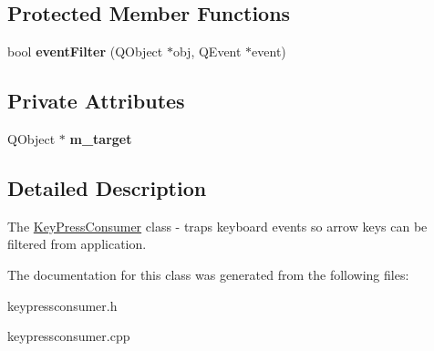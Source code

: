 \subsection*{Protected Member Functions}
\begin{DoxyCompactItemize}
\item 
\mbox{\label{class_key_press_consumer_a375adc3bbaababb0e7a6aee2e12d99c6}} 
bool {\bfseries event\+Filter} (Q\+Object $\ast$obj, Q\+Event $\ast$event)
\end{DoxyCompactItemize}
\subsection*{Private Attributes}
\begin{DoxyCompactItemize}
\item 
\mbox{\label{class_key_press_consumer_a4270d30101dac8588fa1603ce3f573c6}} 
Q\+Object $\ast$ {\bfseries m\+\_\+target}
\end{DoxyCompactItemize}


\subsection{Detailed Description}
The \hyperlink{class_key_press_consumer}{Key\+Press\+Consumer} class -\/ traps keyboard events so arrow keys can be filtered from application. 

The documentation for this class was generated from the following files\+:\begin{DoxyCompactItemize}
\item 
keypressconsumer.\+h\item 
keypressconsumer.\+cpp\end{DoxyCompactItemize}
